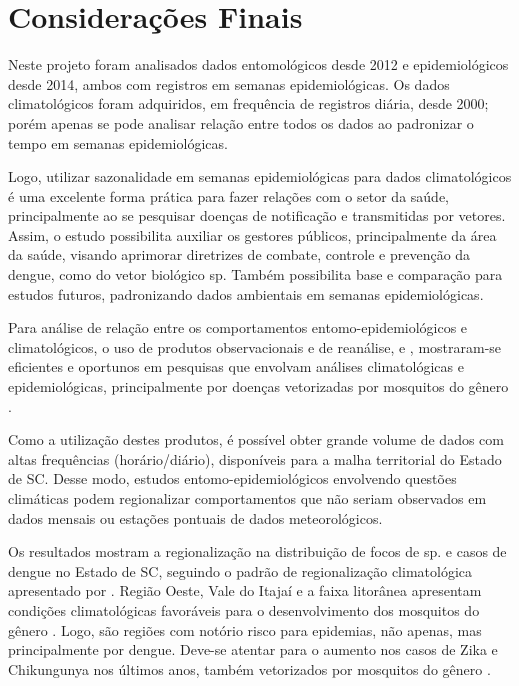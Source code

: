 \chapter{Considerações Finais}

\indent Neste projeto foram analisados dados entomológicos desde 2012 e epidemiológicos desde 2014, ambos com registros em semanas epidemiológicas. Os dados climatológicos foram adquiridos, em frequência de registros diária, desde 2000; porém apenas se pode analisar relação entre todos os dados ao padronizar o tempo em semanas epidemiológicas.

\indent Logo, utilizar sazonalidade em semanas epidemiológicas para dados climatológicos é uma excelente forma prática para fazer relações com o setor da saúde, principalmente ao se pesquisar doenças de notificação e transmitidas por vetores. Assim, o estudo possibilita auxiliar os gestores públicos, principalmente da área da saúde, visando aprimorar diretrizes de combate, controle e prevenção da dengue, como do vetor biológico  sp. Também possibilita base e comparação para estudos futuros, padronizando dados ambientais em semanas epidemiológicas.

\indent Para análise de relação entre os comportamentos entomo-epidemiológicos e climatológicos, o uso de produtos observacionais e de reanálise,  e , mostraram-se eficientes e oportunos em pesquisas que envolvam análises climatológicas e epidemiológicas, principalmente por doenças vetorizadas por mosquitos do gênero .

\indent Como a utilização destes produtos, é possível obter grande volume de dados com altas frequências (horário/diário), disponíveis para a malha territorial do Estado de \acrlong{SC}. Desse modo, estudos entomo-epidemiológicos envolvendo questões climáticas podem regionalizar comportamentos que não seriam observados em dados mensais ou estações pontuais de dados meteorológicos. 

\indent Os resultados mostram a regionalização na distribuição de focos de \label{Aedes} sp. e casos de dengue no Estado de \acrlong{SC}, seguindo o padrão de regionalização climatológica apresentado por . Região Oeste, Vale do Itajaí e a faixa litorânea apresentam condições climatológicas favoráveis para o desenvolvimento dos mosquitos do gênero . Logo, são regiões com notório risco para epidemias, não apenas, mas principalmente por dengue. Deve-se atentar para o aumento nos casos de Zika e Chikungunya nos últimos anos, também vetorizados por mosquitos do gênero  \cite{Valle2015Dengue}.

